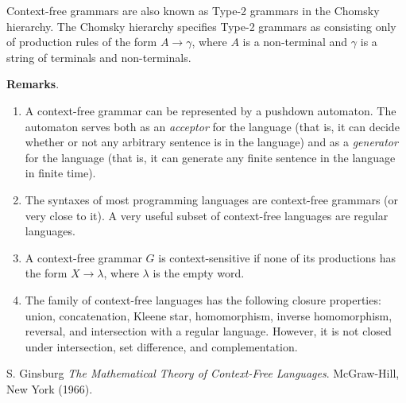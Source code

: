 \documentclass[12pt]{article}
\begin{document}
Context-free grammars are also known as Type-2 grammars in the Chomsky hierarchy.  The Chomsky hierarchy specifies Type-2 grammars as consisting only
of production rules of the form $A \to \gamma$, where $A$ is a non-terminal
and $\gamma$ is a string of terminals and non-terminals.

\textbf{Remarks}.
\begin{enumerate}
\item
A context-free grammar can be represented by a pushdown automaton.  The automaton serves both as an \emph{acceptor} for the language (that is, it can decide whether or not any arbitrary sentence is in the language) and as a \emph{generator} for the language (that is, it can generate any finite sentence in the language in finite time).
\item
The syntaxes of most programming languages are context-free grammars (or very close to it).  A very useful subset of context-free languages are regular languages.
\item
A context-free grammar $G$ is context-sensitive if none of its productions has the form $X\to \lambda$, where $\lambda$ is the empty word.
\item
The family of context-free languages has the following closure properties: union, concatenation, Kleene star, homomorphism, inverse homomorphism, reversal, and intersection with a regular language.  However, it is not closed under intersection, set difference, and complementation.
\end{enumerate}

\begin{thebibliography}{9}
 S. Ginsburg {\em The Mathematical Theory of Context-Free Languages}. McGraw-Hill, New York (1966).
\end{thebibliography}
\end{document}
